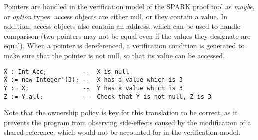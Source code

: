 \documentclass[runningheads]{llncs}
\begin{document}
Pointers are handled in the verification model of the SPARK proof tool as \emph{maybe}, or \emph{option} types: access objects are either null, or they contain a value. In addition, access objects also contain an address, which can be used to handle comparison (two pointers may not be equal even if the values they designate are equal). When a pointer is dereferenced, a verification condition is generated to make sure that the pointer is not null, so that its value can be accessed.
\begin{lstlisting}
X : Int_Acc;          --  X is null
X := new Integer'(3); --  X has a value which is 3
Y := X;               --  Y has a value which is 3
Z := Y.all;           --  Check that Y is not null, Z is 3
\end{lstlisting}
Note that the ownership policy is key for this translation to be correct, as it prevents the program from observing side-effects caused by the modification of a shared reference, which would not be accounted for in the verification model.
\end{document}
